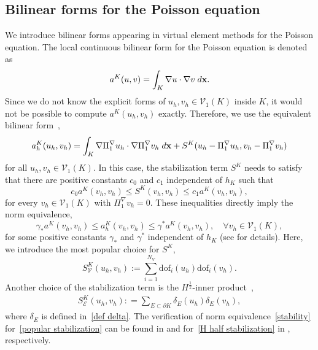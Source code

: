 \documentclass[a4paper]{article}
\theoremstyle{plain}
\theoremstyle{definition}
\numberwithin{equation}{section}
\begin{document}

\subsection{Bilinear forms for the Poisson equation}
We introduce bilinear forms appearing in virtual element methods for the Poisson equation.
The local continuous bilinear form for the Poisson equation is denoted as
\begin{equation}\label{eqn: conti_bilinear}
a^K(u,v) = \int_K \nabla u\cdot\nabla v\;{\rm d}\mathbf{x}.
\end{equation}
Since we do not know the explicit forms of $u_h,v_h\in \mathcal V_1(K)$ inside $K$, it would not be possible to compute $a^K(u_h,v_h)$ exactly.
Therefore, we use the equivalent bilinear form~\cite{BEI13,BEI14},
\begin{equation}
a_h^K(u_h,v_h)=\int_K\nabla \Pi_1^\nabla u_h\cdot\nabla\Pi_1^\nabla v_h\;{\rm d}\mathbf{x}+S^K(u_h-\Pi_1^\nabla u_h,v_h-\Pi_1^\nabla v_h)\label{Poisson bilinear form}
\end{equation}
for all $u_h,v_h\in \mathcal V_1(K)$. In this case, the stabilization term $S^K$ needs to satisfy that there are positive constants $c_0$ and $c_1$ independent of $h_K$ such that
\begin{equation*}
c_0 a^K(v_h,v_h)\leq S^K(v_h,v_h)\leq c_1a^K(v_h,v_h),
\end{equation*}
for every $v_h\in \mathcal V_1(K)$ with $\Pi_1^\nabla v_h=0$.
These inequalities directly imply the norm equivalence,
\begin{equation}
\gamma_*a^K(v_h,v_h)\leq a_h^K(v_h,v_h)\leq \gamma^*a^K(v_h,v_h),\quad\forall v_h\in \mathcal V_1(K),\label{stability}
\end{equation}
for some positive constants $\gamma_*$ and $\gamma^*$ independent of $h_K$ (see \cite{BEI13,BEI14,CHE18} for details).
Here, we introduce the most popular choice for $S^K$,
\begin{equation}
S_\mathcal{V}^K(u_h,v_h):=\sum_{i=1}^{N_V}\text{dof}_i(u_h)\text{dof}_i(v_h).\label{popular stabilization}
\end{equation}
Another choice of the stabilization term is the $H^{\frac{1}{2}}$-inner product~\cite{CAO18},
\begin{align}
\label{H half stabilization}S^K_\mathcal{E}(u_h,v_h):
=\sum_{E\subset \partial K}\delta_E(u_h)\delta_E(v_h),
\end{align}
where $\delta_E$ is defined in~\eqref{def delta}.
The verification of norm equivalence~\eqref{stability} for~\eqref{popular stabilization} can be found in \cite{CHE18} and for~\eqref{H half stabilization} in \cite{CAO18}, respectively.
\end{document}
